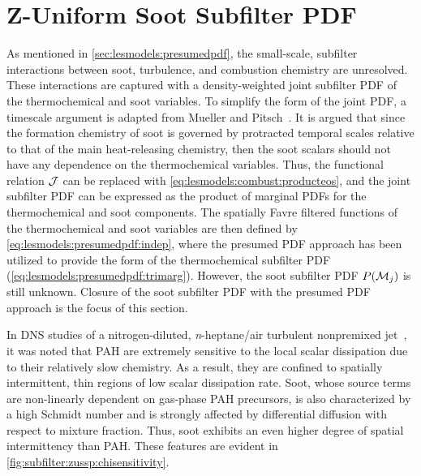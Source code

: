 \section{Z-Uniform Soot Subfilter PDF}
\label{sec:subfilter:zussp}

As mentioned in \cref{sec:lesmodels:presumedpdf}, the small-scale, subfilter interactions between soot, turbulence, and combustion chemistry are unresolved. These interactions are captured with a density-weighted joint subfilter PDF of the thermochemical and soot variables. To simplify the form of the joint PDF, a timescale argument is adapted from Mueller and Pitsch~\cite{subfilterpdf2011}. It is argued that since the formation chemistry of soot is governed by protracted temporal scales relative to that of the main heat-releasing chemistry, then the soot scalars should not have any dependence on the thermochemical variables. Thus, the functional relation $\mathcal{J}$ can be replaced with \cref{eq:lesmodels:combust:producteos}, and the joint subfilter PDF can be expressed as the product of marginal PDFs for the thermochemical and soot components. The spatially Favre filtered functions of the thermochemical and soot variables are then defined by \cref{eq:lesmodels:presumedpdf:indep}, where the presumed PDF approach has been utilized to provide the form of the thermochemical subfilter PDF (\cref{eq:lesmodels:presumedpdf:trimarg}). However, the soot subfilter PDF $P(\mathcal{M}_j)$ is still unknown. Closure of the soot subfilter PDF with the presumed PDF approach is the focus of this section.

In DNS studies of a nitrogen-diluted, \textit{n}-heptane/air turbulent nonpremixed jet~\cite{bisetti2012,attili2014,attili2015}, it was noted that PAH are extremely sensitive to the local scalar dissipation due to their relatively slow chemistry. As a result, they are confined to spatially intermittent, thin regions of low scalar dissipation rate. Soot, whose source terms are non-linearly dependent on gas-phase PAH precursors, is also characterized by a high Schmidt number and is strongly affected by differential diffusion with respect to mixture fraction. Thus, soot exhibits an even higher degree of spatial intermittency than PAH. These features are evident in \cref{fig:subfilter:zussp:chisensitivity}.

